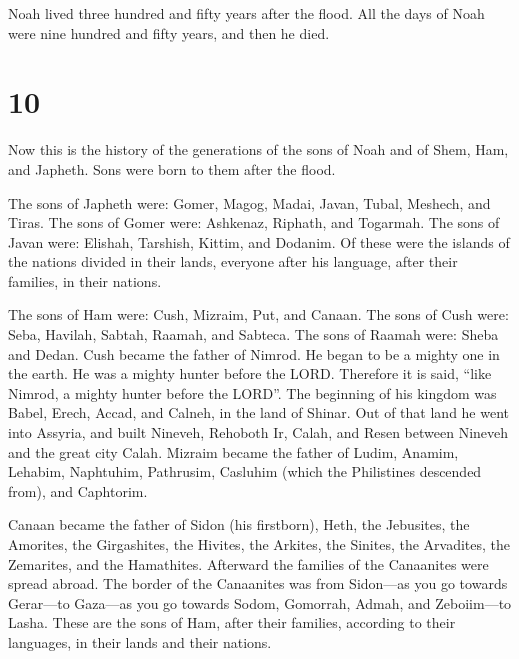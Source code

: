  Noah lived three hundred and fifty years after the flood.
 All the days of Noah were nine hundred and fifty years,
and then he died.

\hypertarget{section-9}{%
\section{10}\label{section-9}}

 Now this is the history of the generations of the sons of
Noah and of Shem, Ham, and Japheth. Sons were born to them after the
flood.

 The sons of Japheth were: Gomer, Magog, Madai, Javan,
Tubal, Meshech, and Tiras.  The sons of Gomer were:
Ashkenaz, Riphath, and Togarmah.  The sons of Javan were:
Elishah, Tarshish, Kittim, and Dodanim.  Of these were the
islands of the nations divided in their lands, everyone after his
language, after their families, in their nations.

 The sons of Ham were: Cush, Mizraim, Put, and Canaan.
 The sons of Cush were: Seba, Havilah, Sabtah, Raamah, and
Sabteca. The sons of Raamah were: Sheba and Dedan.  Cush
became the father of Nimrod. He began to be a mighty one in the earth.
 He was a mighty hunter before the LORD. Therefore it is
said, ``like Nimrod, a mighty hunter before the LORD''. 
The beginning of his kingdom was Babel, Erech, Accad, and Calneh, in the
land of Shinar.  Out of that land he went into Assyria, and
built Nineveh, Rehoboth Ir, Calah,  and Resen between
Nineveh and the great city Calah.  Mizraim became the
father of Ludim, Anamim, Lehabim, Naphtuhim,  Pathrusim,
Casluhim (which the Philistines descended from), and Caphtorim.

 Canaan became the father of Sidon (his firstborn), Heth,
 the Jebusites, the Amorites, the Girgashites,
 the Hivites, the Arkites, the Sinites,  the
Arvadites, the Zemarites, and the Hamathites. Afterward the families of
the Canaanites were spread abroad.  The border of the
Canaanites was from Sidon---as you go towards Gerar---to Gaza---as you
go towards Sodom, Gomorrah, Admah, and Zeboiim---to Lasha. 
These are the sons of Ham, after their families, according to their
languages, in their lands and their nations.

